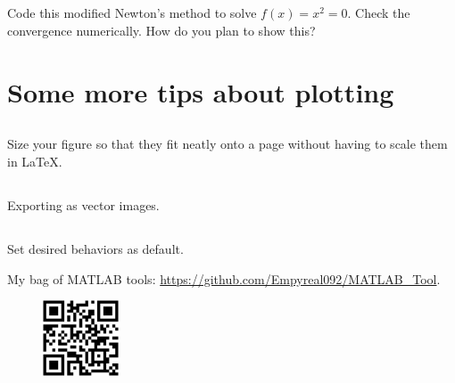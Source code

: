 \documentclass[11pt,letterpaper]{article}
\begin{document}
\subsection{}
Code this modified Newton's method to solve $f(x) = x^2 = 0$. Check the convergence numerically. How do you plan to show this?

\newpage
\section{Some more tips about plotting}
\subsection{}
Size your figure so that they fit neatly onto a page without having to scale them in \LaTeX. 

\subsection{}
Exporting as vector images.

\subsection{}
Set desired behaviors as default.

\vspace{1cm}
My bag of MATLAB tools: \url{https://github.com/Empyreal092/MATLAB_Tool}.
\begin{figure}[H]
    \centering
    \includegraphics[width = 0.2\textwidth]{figs/MATLAB_Tool_QR}
\end{figure}



    
    
% 
% 
\end{document}
